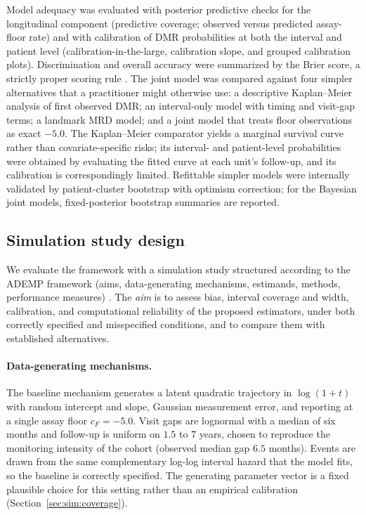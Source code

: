 \documentclass[11pt]{article}
\begin{document}
Model adequacy was evaluated with posterior predictive checks for the
longitudinal component (predictive coverage; observed versus predicted
assay-floor rate) and with calibration of DMR probabilities at both the
interval and patient level (calibration-in-the-large, calibration slope,
and grouped calibration plots). Discrimination and overall accuracy were
summarized by the Brier score, a strictly proper scoring rule
\cite{GneitingRaftery2007ProperScoring}. The joint model was compared against four
simpler alternatives that a practitioner might otherwise use: a
descriptive Kaplan--Meier analysis of first observed DMR; an interval-only
model with timing and visit-gap terms; a landmark MRD model; and a joint
model that treats floor observations as exact $-5.0$. The Kaplan--Meier
comparator yields a marginal survival curve rather than covariate-specific
risks; its interval- and patient-level probabilities were obtained by
evaluating the fitted curve at each unit's follow-up, and its calibration is
correspondingly limited. Refittable simpler models were internally validated
by patient-cluster bootstrap with optimism correction; for the Bayesian joint
models, fixed-posterior bootstrap summaries are reported.

\subsection{Simulation study design}
\label{sec:sim}

We evaluate the framework with a simulation study structured according to the
ADEMP framework (aims, data-generating mechanisms, estimands, methods,
performance measures) \cite{GneitingRaftery2007ProperScoring}. The
\emph{aim} is to assess bias, interval coverage and width, calibration, and
computational reliability of the proposed estimators, under both correctly
specified and misspecified conditions, and to compare them with established
alternatives.

\paragraph{Data-generating mechanisms.} The baseline mechanism generates a
latent quadratic trajectory in $\log(1+t)$ with random intercept and slope,
Gaussian measurement error, and reporting at a single assay floor $c_F=-5.0$.
Visit gaps are lognormal with a median of six months and follow-up is uniform on
$1.5$ to $7$ years, chosen to reproduce the monitoring intensity of the cohort
(observed median gap $6.5$ months). Events are drawn from the same
complementary log-log interval hazard that the model fits, so the baseline is
correctly specified. The generating parameter vector is a fixed plausible choice
for this setting rather than an empirical calibration
(Section~\ref{sec:sim:coverage}).
\end{document}
